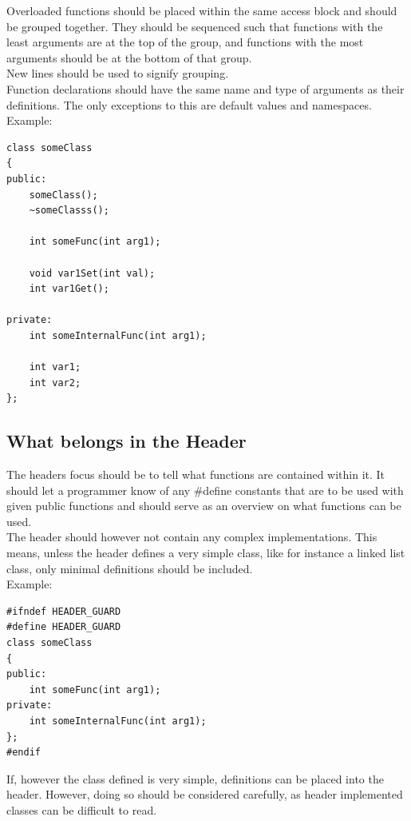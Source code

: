 \documentclass[12pt,article]{memoir}
\begin{document}
\noindent
Overloaded functions should be placed within the same access block and should be grouped together. They should be sequenced such that functions with the least arguments are at the top of the group, and functions with the most arguments should be at the bottom of that group.\\

\noindent
New lines should be used to signify grouping.\\

\noindent
Function declarations should have the same name and type of arguments as their definitions. The only exceptions to this are default values and namespaces.\\

\newpage
\noindent
Example:

\begin{lstlisting}
class someClass
{
public:
	someClass();
	~someClasss();
	
	int someFunc(int arg1);
	
	void var1Set(int val);
	int var1Get();
	
private:
	int someInternalFunc(int arg1);
	
	int var1;
	int var2;
};
\end{lstlisting}



\newpage
\subsection{What belongs in the Header}
The headers focus should be to tell what functions are contained within it. It should let a programmer know of any \#define constants that are to be used with given public functions and should serve as an overview on what functions can be used.\\

\noindent
The header should however not contain any complex implementations. This means, unless the header defines a very simple class, like for instance a linked list class, only minimal definitions should be included.\\

\noindent
Example:
\begin{lstlisting}
#ifndef HEADER_GUARD
#define HEADER_GUARD
class someClass
{
public:
	int someFunc(int arg1);
private:
	int someInternalFunc(int arg1);
};
#endif
\end{lstlisting}

\noindent
If, however the class defined is very simple, definitions can be placed into the header. However, doing so should be considered carefully, as header implemented classes can be difficult to read.\\
\end{document}
